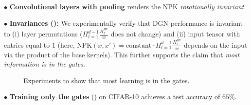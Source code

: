 $\bullet$ \textbf{Convolutional layers with pooling} renders the NPK \emph{rotationally invariant}. 

$\bullet$ \textbf{Invariances ():} We experimentally verify that DGN performance is invariant to (i) layer permutations ($\Pi_{l=1}^{d-1} \frac{H^{\text{lyr}}_l}{w}$ does not change) and (ii) input tensor with entries equal to $1$ (here, NPK$(x,x')= \text{constant}\cdot \Pi_{l=1}^{d-1} \frac{H^{\text{lyr}}_l}{w}$ depends on the input via the product of the base kernels). This further supports the claim that \emph{most information is in the gates}. %
\FloatBarrier
\begin{figure}[h]
\centering
{}
\caption{Experiments to show that most learning is in the gates.}
\label{fig:permutations}
\end{figure}

$\bullet$ \textbf{Training only the gates} () on CIFAR-10 achieves a test accuracy of $65\%$.

